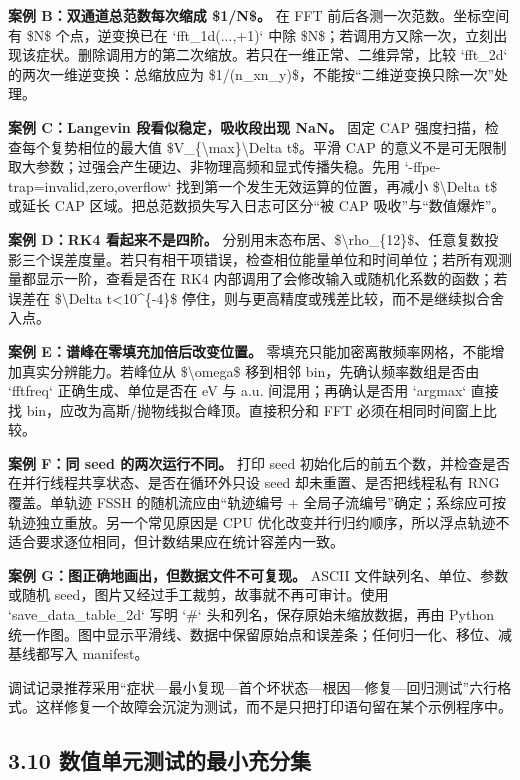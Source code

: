 \documentclass[UTF8,openany,11pt,fontset=fandol]{ctexbook}
\begin{document}
\textbf{案例 B：双通道总范数每次缩成 \$1/N\$。} 在 FFT
前后各测一次范数。坐标空间有 \$N\$ 个点，逆变换已在 `fft\_1d(...,+1)`
中除
\$N\$；若调用方又除一次，立刻出现该症状。删除调用方的第二次缩放。若只在一维正常、二维异常，比较
`fft\_2d` 的两次一维逆变换：总缩放应为
\$1/(n\_xn\_y)\$，不能按``二维逆变换只除一次''处理。

\textbf{案例 C：Langevin 段看似稳定，吸收段出现 NaN。} 固定 CAP
强度扫描，检查每个复势相位的最大值
\$V\_\{\textbackslash max\}\textbackslash Delta t\$。平滑 CAP
的意义不是可无限制取大参数；过强会产生硬边、非物理高频和显式传播失稳。先用
`-ffpe-trap=invalid,zero,overflow` 找到第一个发生无效运算的位置，再减小
\$\textbackslash Delta t\$ 或延长 CAP
区域。把总范数损失写入日志可区分``被 CAP 吸收''与``数值爆炸''。

\textbf{案例 D：RK4 看起来不是四阶。}
分别用末态布居、\$\textbackslash rho\_\{12\}\$、任意复数投影三个误差度量。若只有相干项错误，检查相位能量单位和时间单位；若所有观测量都显示一阶，查看是否在
RK4 内部调用了会修改输入或随机化系数的函数；若误差在
\$\textbackslash Delta t\textless10\^{}\{-4\}\$
停住，则与更高精度或残差比较，而不是继续拟合舍入点。

\textbf{案例 E：谱峰在零填充加倍后改变位置。}
零填充只能加密离散频率网格，不能增加真实分辨能力。若峰位从
\$\textbackslash omega\$ 移到相邻 bin，先确认频率数组是否由 `fftfreq`
正确生成、单位是否在 eV 与 a.u. 间混用；再确认是否用 `argmax` 直接找
bin，应改为高斯/抛物线拟合峰顶。直接积分和 FFT 必须在相同时间窗上比较。

\textbf{案例 F：同 seed 的两次运行不同。} 打印 seed
初始化后的前五个数，并检查是否在并行线程共享状态、是否在循环外只设 seed
却未重置、是否把线程私有 RNG 覆盖。单轨迹 FSSH 的随机流应由``轨迹编号 +
全局子流编号''确定；系综应可按轨迹独立重放。另一个常见原因是 CPU
优化改变并行归约顺序，所以浮点轨迹不适合要求逐位相同，但计数结果应在统计容差内一致。

\textbf{案例 G：图正确地画出，但数据文件不可复现。} ASCII
文件缺列名、单位、参数或随机
seed，图片又经过手工裁剪，故事就不再可审计。使用 `save\_data\_table\_2d`
写明 `\#` 头和列名，保存原始未缩放数据，再由 Python
统一作图。图中显示平滑线、数据中保留原始点和误差条；任何归一化、移位、减基线都写入
manifest。

调试记录推荐采用``症状---最小复现---首个坏状态---根因---修复---回归测试''六行格式。这样修复一个故障会沉淀为测试，而不是只把打印语句留在某个示例程序中。

\subsection{\texorpdfstring{\textbf{3.10
数值单元测试的最小充分集}}{3.10 数值单元测试的最小充分集}}\label{ux6570ux503cux5355ux5143ux6d4bux8bd5ux7684ux6700ux5c0fux5145ux5206ux96c6}
\end{document}
